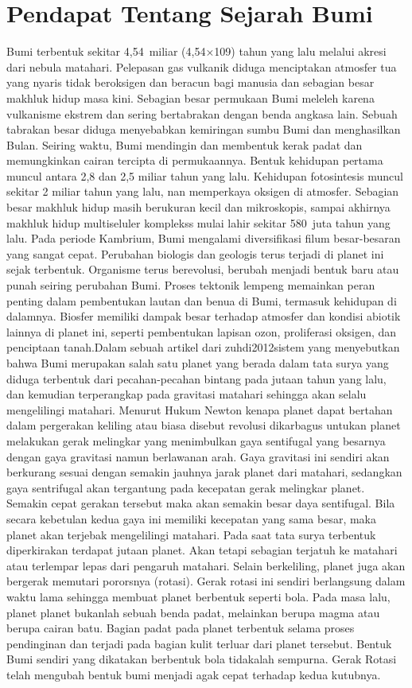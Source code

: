 \section{Pendapat Tentang Sejarah Bumi}
Bumi terbentuk sekitar 4,54 miliar (4,54×109) tahun yang lalu melalui akresi dari nebula matahari. Pelepasan gas vulkanik diduga menciptakan atmosfer tua yang nyaris tidak beroksigen dan beracun bagi manusia dan sebagian besar makhluk hidup masa kini. Sebagian besar permukaan Bumi meleleh karena vulkanisme ekstrem dan sering bertabrakan dengan benda angkasa lain. Sebuah tabrakan besar diduga menyebabkan kemiringan sumbu Bumi dan menghasilkan Bulan. Seiring waktu, Bumi mendingin dan membentuk kerak padat dan memungkinkan cairan tercipta di permukaannya. Bentuk kehidupan pertama muncul antara 2,8 dan 2,5 miliar tahun yang lalu. Kehidupan fotosintesis muncul sekitar 2 miliar tahun yang lalu, nan memperkaya oksigen di atmosfer. Sebagian besar makhluk hidup masih berukuran kecil dan mikroskopis, sampai akhirnya makhluk hidup multiseluler komplekss mulai lahir sekitar 580 juta tahun yang lalu. Pada periode Kambrium, Bumi mengalami diversifikasi filum besar-besaran yang sangat cepat. Perubahan biologis dan geologis terus terjadi di planet ini sejak terbentuk. Organisme terus berevolusi, berubah menjadi bentuk baru atau punah seiring perubahan Bumi. Proses tektonik lempeng memainkan peran penting dalam pembentukan lautan dan benua di Bumi, termasuk kehidupan di dalamnya. Biosfer memiliki dampak besar terhadap atmosfer dan kondisi abiotik lainnya di planet ini, seperti pembentukan lapisan ozon, proliferasi oksigen, dan penciptaan tanah.Dalam sebuah artikel dari zuhdi2012sistem yang menyebutkan bahwa Bumi merupakan salah satu planet yang berada dalam tata surya yang diduga terbentuk dari pecahan-pecahan bintang pada jutaan tahun yang lalu, dan kemudian terperangkap pada gravitasi matahari sehingga akan selalu mengelilingi matahari. Menurut Hukum Newton kenapa planet dapat bertahan dalam pergerakan keliling atau biasa disebut revolusi dikarbagus untukan planet melakukan gerak melingkar yang menimbulkan gaya sentifugal yang besarnya  dengan gaya gravitasi namun berlawanan arah. Gaya gravitasi ini sendiri akan berkurang sesuai dengan semakin jauhnya jarak planet dari matahari, sedangkan gaya sentrifugal  akan tergantung pada kecepatan gerak melingkar planet. Semakin cepat gerakan tersebut maka akan semakin besar daya sentifugal. Bila secara kebetulan kedua gaya ini memiliki kecepatan yang sama besar, maka planet akan terjebak mengelilingi matahari. Pada saat tata surya terbentuk diperkirakan terdapat jutaan planet. Akan tetapi sebagian terjatuh ke matahari atau terlempar lepas dari pengaruh matahari. Selain berkeliling, planet juga akan bergerak memutari pororsnya (rotasi). Gerak rotasi ini sendiri berlangsung dalam waktu lama sehingga membuat planet berbentuk seperti bola. Pada masa lalu, planet planet bukanlah sebuah benda padat, melainkan berupa magma atau berupa cairan batu. Bagian padat pada planet terbentuk selama proses pendinginan dan terjadi pada bagian kulit terluar dari planet tersebut. Bentuk Bumi sendiri yang dikatakan berbentuk bola tidakalah sempurna. Gerak Rotasi telah mengubah bentuk bumi menjadi agak cepat terhadap kedua kutubnya.\cite{zuhdi2012sistem}


